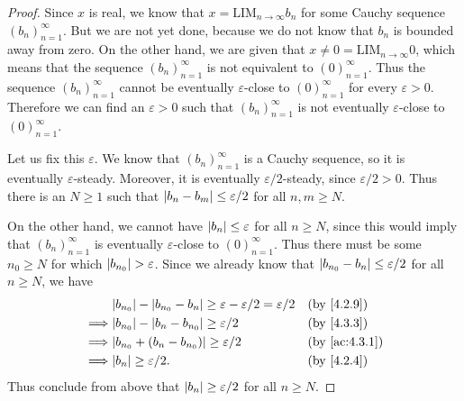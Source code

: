 \begin{proof}
  Since \(x\) is real, we know that \(x = \text{LIM}_{n \to \infty} b_n\) for some Cauchy sequence \((b_n)_{n = 1}^{\infty}\).
  But we are not yet done, because we do not know that \(b_n\) is bounded away from zero.
  On the other hand, we are given that \(x \neq 0 = \text{LIM}_{n \to \infty} 0\), which means that the sequence \((b_n)_{n = 1}^{\infty}\) is not equivalent to \((0)_{n = 1}^{\infty}\).
  Thus the sequence \((b_n)_{n = 1}^{\infty}\) cannot be eventually \(\varepsilon\)-close to \((0)_{n = 1}^{\infty}\) for every \(\varepsilon > 0\).
  Therefore we can find an \(\varepsilon > 0\) such that \((b_n)_{n = 1}^{\infty}\) is not eventually \(\varepsilon\)-close to \((0)_{n = 1}^{\infty}\).

  Let us fix this \(\varepsilon\).
  We know that \((b_n)_{n = 1}^{\infty}\) is a Cauchy sequence, so it is eventually \(\varepsilon\)-steady.
  Moreover, it is eventually \(\varepsilon / 2\)-steady, since \(\varepsilon / 2 > 0\).
  Thus there is an \(N \geq 1\) such that \(\left\lvert b_n - b_m\right\rvert \leq \varepsilon / 2\) for all \(n, m \geq N\).

  On the other hand, we cannot have \(\left\lvert b_n\right\rvert \leq \varepsilon\) for all \(n \geq N\), since this would imply that \((b_n)_{n = 1}^{\infty}\) is eventually \(\varepsilon\)-close to \((0)_{n = 1}^{\infty}\).
  Thus there must be some \(n_0 \geq N\) for which \(\left\lvert b_{n_0}\right\rvert > \varepsilon\).
  Since we already know that \(\left\lvert b_{n_0} - b_n\right\rvert \leq \varepsilon / 2\) for all \(n \geq N\), we have
  \begin{align*}
             & \abs{b_{n_0}} - \abs{b_{n_0} - b_n} \geq \varepsilon - \varepsilon / 2 = \varepsilon / 2 &  & \by{4.2.9}    \\
    \implies & \abs{b_{n_0}} - \abs{b_n - b_{n_0}} \geq \varepsilon / 2                                 &  & \by{4.3.3}    \\
    \implies & \abs{b_{n_0} + (b_n - b_{n_0})} \geq \varepsilon / 2                                     &  & \by{ac:4.3.1} \\
    \implies & \abs{b_n} \geq \varepsilon / 2.                                                          &  & \by{4.2.4}    \\
  \end{align*}
  Thus conclude from above that \(\left\lvert b_n\right\rvert \geq \varepsilon / 2\) for all \(n \geq N\).


\end{proof}
